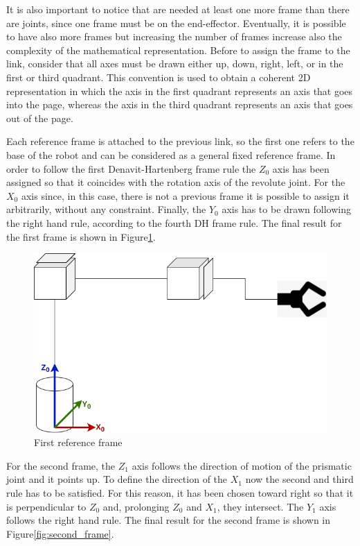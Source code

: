It is also important to notice that are needed at least one more frame than there are joints, since one frame must be on the end-effector. Eventually, it is possible to have also more frames but increasing the number of frames increase also the complexity of the mathematical representation. Before to assign the frame to the link, consider that all axes must be drawn either up, down, right, left, or in the first or third quadrant. This convention is used to obtain a coherent 2D representation in which the axis in the first quadrant represents an axis that goes into the page, whereas the axis in the third quadrant represents an axis that goes out of the page.

Each reference frame is attached to the previous link, so the first one refers to the base of the robot and can be considered as a general fixed reference frame. In order to follow the first Denavit-Hartenberg frame rule the $Z_0$ axis has been assigned so that it coincides with the rotation axis of the revolute joint. For the $X_0$ axis since, in this case, there is not a previous frame it is possible to assign it arbitrarily, without any constraint. Finally, the $Y_0$ axis has to be drawn following the right hand rule, according to the fourth DH frame rule. The final result for the first frame is shown in Figure\ref{fig:first_frame}.

\begin{figure}[!h]
\begin{center}
\includegraphics[width=0.6\linewidth]{capitolo3/figure/first_frame.png}
\caption{First reference frame}
\label{fig:first_frame}
\end{center}
\end{figure}

For the second frame, the $Z_1$ axis follows the direction of motion of the prismatic joint and it points up. To define the direction of the $X_1$ now the second and third rule has to be satisfied. For this reason, it has been chosen toward right so that it is perpendicular to $Z_0$ and, prolonging $Z_0$ and $X_1$, they intersect. The $Y_1$ axis follows the right hand rule. The final result for the second frame is shown in Figure\ref{fig:second_frame}.

